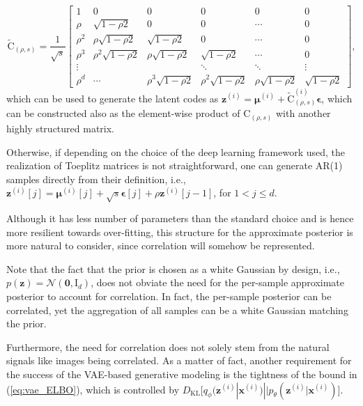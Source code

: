\documentclass{article}
\begin{document}
\begin{equation}    \label{eq:rho_chol}
\tilde{\mathrm{C}}_{(\rho,s)} = \frac{1}{\sqrt{s}} \begin{bmatrix}
    1          & 0        & 0     & 0       & 0   & 0 \\
    \rho       & \sqrt{1-\rho 2}           & 0       & 0       & \cdots   & 0 \\
    \rho^2     & \rho\sqrt{1-\rho 2}        & \sqrt{1-\rho 2}          & 0         & \cdots   & 0 \\
    \rho^3     & \rho^2\sqrt{1-\rho 2}      & \rho\sqrt{1-\rho 2}       & \sqrt{1-\rho 2}           & \cdots   & 0 \\
    \vdots     &       &       & \ddots       & \ddots   & \vdots      \\
    \rho^{d} & \cdots  & \rho^3 \sqrt{1-\rho 2} & \rho^2 \sqrt{1-\rho 2}   & \rho \sqrt{1-\rho 2}   & \sqrt{1-\rho 2}
  \end{bmatrix},
\end{equation}
which can be used to generate the latent codes as $\mathbf{z}^{(i)} = \boldsymbol{\mu}^{(i)} + \tilde{\mathrm{C}}_{(\rho,s)}^{(i)} \boldsymbol{\epsilon}$, which can be constructed also as the element-wise product of $\mathrm{C}_{(\rho,s)}$ with another highly structured matrix.

Otherwise, if depending on the choice of the deep learning framework used, the realization of Toeplitz matrices is not straightforward, one can generate AR(1) samples directly from their definition, i.e., $\mathbf{z}^{(i)}[j] = \boldsymbol{\mu}^{(i)}[j] + \sqrt{s} \boldsymbol{\epsilon}[j] + \rho \mathbf{z}^{(i)}[j-1]$, for $1 < j \leqslant d$.

Although it has less number of parameters than the standard choice and is hence more resilient towards over-fitting, this structure for the approximate posterior is more natural to consider, since correlation will somehow be represented. 

Note that the fact that the prior is chosen as a white Gaussian by design, i.e., $p(\mathbf{z}) = \mathcal{N}(\mathbf{0}, \mathrm{I}_d)$, does not obviate the need for the per-sample approximate posterior to account for correlation. In fact, the per-sample posterior can be correlated, yet the aggregation of all samples can be a white Gaussian matching the prior.

Furthermore, the need for correlation does not solely stem from the natural signals like images being correlated. As a matter of fact, another requirement for the success of the VAE-based generative modeling is the tightness of the bound in (\ref{eq:vae_ELBO}), which is controlled by $D_{\text{KL}}\big[ q_{\phi}(\mathbf{z}^{(i)}  | \mathbf{x}^{(i)}) || p_{\theta}(\mathbf{z}^{(i)} | \mathbf{x}^{(i)}) \big]$.
\end{document}
